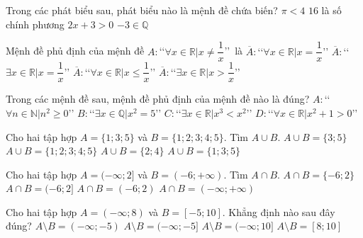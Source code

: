\begin{ex}%
	Trong các phát biểu sau, phát biểu nào là mệnh đề chứa biến?
	\choice
	{$\pi <4$}
	{$16$ là số chính phương}
	{\True $2x+3>0$}
	{$-3\in\mathbb{Q}$}
\end{ex}
\begin{ex}%
	Mệnh đề phủ định của mệnh đề $A\colon$\lq\lq $\forall x\in\mathbb{R}| x\ne \dfrac{1}{x}$\rq\rq\, là
	\choice
	{$\overline{A}\colon$\lq\lq $\forall x\in\mathbb{R}| x= \dfrac{1}{x}$\rq\rq}
	{\True $\overline{A}\colon$\lq\lq $\exists x\in\mathbb{R}| x= \dfrac{1}{x}$\rq\rq}
	{$\overline{A}\colon$\lq\lq $\forall x\in\mathbb{R}| x\le \dfrac{1}{x}$\rq\rq}
	{$\overline{A}\colon$\lq\lq $\exists x\in\mathbb{R}| x> \dfrac{1}{x}$\rq\rq}
\end{ex}
\begin{ex}%
	Trong các mệnh đề sau, mệnh đề phủ định của mệnh đề nào là đúng?
	\choice
	{$A\colon$\lq\lq $\forall n\in\mathbb{N}| n^2\ge 0$\rq\rq}
	{\True $B\colon$\lq\lq $\exists x\in\mathbb{Q}| x^2=5$\rq\rq}
	{$C\colon$\lq\lq $\exists x\in\mathbb{R}| x^3<x^2$\rq\rq}
	{$D\colon$\lq\lq $\forall x\in\mathbb{R}| x^2+1>0$\rq\rq}
\end{ex}
\begin{ex}%
	Cho hai tập hợp $A=\{1;3;5\}$ và $B=\{1;2;3;4;5\}$. Tìm $A\cup B$.
	\choice
	{$A\cup B=\{3;5\}$}
	{\True $A\cup B=\{1;2;3;4;5\}$}
	{$A\cup B=\{2;4\}$}
	{$A\cup B=\{1;3;5\}$}
\end{ex}
\begin{ex}%
	Cho hai tập hợp $A=(-\infty;2]$ và $B=(-6;+\infty)$. Tìm $A\cap B$.
	\choice
	{$A\cap B=\{-6;2\}$}
	{\True $A\cap B=(-6;2]$}
	{$A\cap B=(-6;2)$}
	{$A\cap B=(-\infty;+\infty)$}
	\loigiai{
		Ta có $A\cap B=(-6;2]$.
	}
\end{ex}
\begin{ex}%
	Cho hai tập hợp $A=(-\infty;8)$ và $B=[-5;10]$. Khẳng định nào sau đây đúng?
	\choice
	{\True $A\setminus B=(-\infty;-5)$}
	{$A\setminus B=(-\infty;-5]$}
	{$A\setminus B=(-\infty;10]$}
	{$A\setminus B=[8;10]$}
\end{ex}

